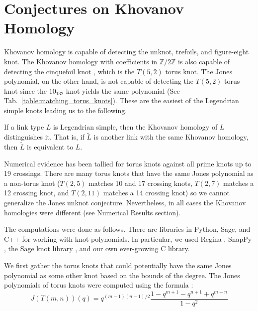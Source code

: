 \section{Conjectures on Khovanov Homology}
    Khovanov homology is capable of detecting the
    unknot, trefoils, and figure-eight knot. The Khovanov homology with
    coefficients in $\mathbb{Z}/2\mathbb{Z}$ is also capable of detecting
    the cinquefoil knot \cite{BaldwinYingSivekCinquefoilKhovanov},
    which is the $T(5,2)$ torus knot. The Jones
    polynomial, on the other hand, is not capable of detecting the
    $T(5,2)$ torus knot since the $10_{132}$ knot yields the same
    polynomial (See Tab.~\ref{table:matching_torus_knots}).
    These are the easiest of the Legendrian simple knots
    leading us to the following.
    \begin{conjecture}
        If a link type $L$ is Legendrian simple, then the Khovanov homology
        of $L$ distinguishes it. That is, if $\tilde{L}$
        is another link with the same Khovanov homology, then $\tilde{L}$ is
        equivalent to $L$.
    \end{conjecture}
    Numerical evidence has been tallied for torus knots
    against all prime knots up to 19 crossings. There are many
    torus knots that have the same Jones polynomial as a non-torus knot
    ($T(2,5)$ matches 10 and 17 crossing knots, $T(2,7)$
    matches a 12 crossing knot, and $T(2,11)$ matches a 14 crossing knot)
    so we cannot generalize the Jones unknot conjecture. Nevertheless, in
    all cases the Khovanov homologies were different
    (see Numerical Results section).
    \par\hfill\par
    The computations were done as follows. There are libraries in Python,
    Sage, and C++ for working with knot polynomials. In particular, we used
    Regina \cite{regina}, SnapPy \cite{SnapPy}, the Sage knot library
    \cite{sage}, and our own ever-growing C library.
    \par\hfill\par
    We first gather the torus knots that could potentially have the same
    Jones polynomial as some other knot based on the bounds of the degree.
    The Jones polynomials of torus knots were computed using the formula
    \cite{jonesfordummyvjones}:
    \begin{equation}
        \label{eqn:jones_poly_torus}%
        J(T(m,n))(q)=q^{(m-1)(n-1)/2}
            \frac{1-q^{m+1}-q^{n+1}+q^{m+n}}{1-q^{2}}
    \end{equation}
